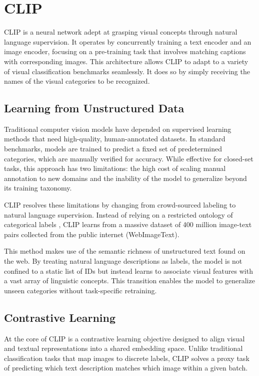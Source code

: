 
\section{CLIP}
CLIP\cite{radford2021learning} is a neural network adept at grasping visual concepts through natural language supervision. It operates by concurrently training a text encoder and an image encoder, focusing on a pre-training task that involves matching captions with corresponding images. This architecture allows CLIP\cite{radford2021learning} to adapt to a variety of visual classification benchmarks seamlessly. It does so by simply receiving the names of the visual categories to be recognized.
\subsection{Learning from Unstructured Data}
Traditional computer vision models have depended on supervised learning methods that need high-quality, human-annotated datasets. In standard benchmarks, models are trained to predict a fixed set of predetermined categories, which are manually verified for accuracy. While effective for closed-set tasks, this approach has two limitations: the high cost of scaling manual annotation to new domains and the inability of the model to generalize beyond its training taxonomy.

CLIP\cite{radford2021learning} resolves these limitations by changing from crowd-sourced labeling to natural language supervision. Instead of relying on a restricted ontology of categorical labels , CLIP learns from a massive dataset of 400 million image-text pairs collected from the public internet (WebImageText). 

This method makes use of the semantic richness of unstructured text found on the web. By treating natural language descriptions as labels, the model is not confined to a static list of IDs but instead learns to associate visual features with a vast array of linguistic concepts. This transition enables the model to generalize unseen categories without task-specific retraining.

\subsection{Contrastive Learning}
At the core of CLIP\cite{radford2021learning} is a contrastive learning objective designed to align visual and textual representations into a shared embedding space. Unlike traditional classification tasks that map images to discrete labels, CLIP solves a proxy task of predicting which text description matches which image within a given batch.


